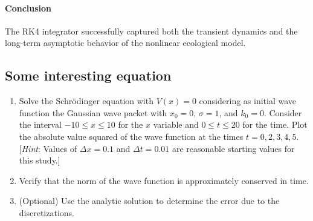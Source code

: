 \begin{solution}
	\paragraph{Conclusion}
	The RK4 integrator successfully captured both the transient dynamics and the
	long-term asymptotic behavior of the nonlinear ecological model.

\end{solution}

\subsection{Some interesting equation}

\begin{exercise}
	\begin{enumerate}
		\item Solve the Schr\"odinger equation with $V(x)=0$ considering as
		      initial wave function the Gaussian wave packet with $x_0=0$, $\sigma=1$, and
		      $k_0=0$. Consider the interval $-10\leq x\leq 10$ for the $x$ variable and
		      $0\leq t\leq 20$ for the time. Plot the absolute value squared of the wave
		      function at the times $t=0,2,3,4,5$. [\emph{Hint}: Values of $\Delta x=0.1$ and
				      $\Delta t=0.01$ are reasonable starting values for this study.]

		\item Verify that the norm of the wave function is approximately conserved in time.

		\item (Optional) Use the analytic solution to determine the
		      error due to the discretizations.
	\end{enumerate}
\end{exercise}

